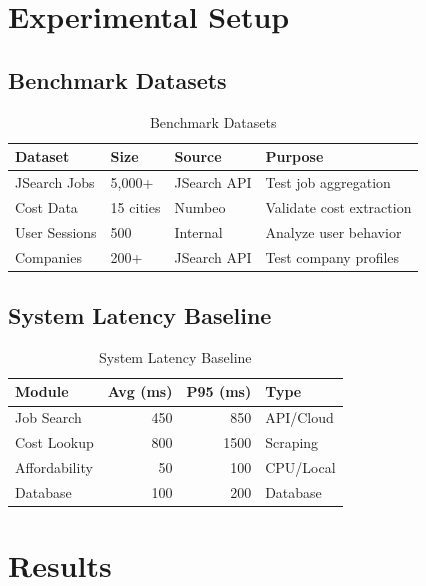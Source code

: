 \documentclass[12pt,a4paper,oneside]{report}
\begin{document}
\section{Experimental Setup}

\subsection{Benchmark Datasets}

\begin{table}[H]
\centering
\caption{Benchmark Datasets}
\label{tab:datasets}
\begin{tabular}{|l|l|l|l|}
\hline
\textbf{Dataset} & \textbf{Size} & \textbf{Source} & \textbf{Purpose} \\
\hline
JSearch Jobs & 5,000+ & JSearch API & Test job aggregation \\
\hline
Cost Data & 15 cities & Numbeo & Validate cost extraction \\
\hline
User Sessions & 500 & Internal & Analyze user behavior \\
\hline
Companies & 200+ & JSearch API & Test company profiles \\
\hline
\end{tabular}
\end{table}

\subsection{System Latency Baseline}

\begin{table}[H]
\centering
\caption{System Latency Baseline}
\label{tab:latency}
\begin{tabular}{|l|r|r|l|}
\hline
\textbf{Module} & \textbf{Avg (ms)} & \textbf{P95 (ms)} & \textbf{Type} \\
\hline
Job Search & 450 & 850 & API/Cloud \\
\hline
Cost Lookup & 800 & 1500 & Scraping \\
\hline
Affordability & 50 & 100 & CPU/Local \\
\hline
Database & 100 & 200 & Database \\
\hline
\end{tabular}
\end{table}

\section{Results}
\end{document}
